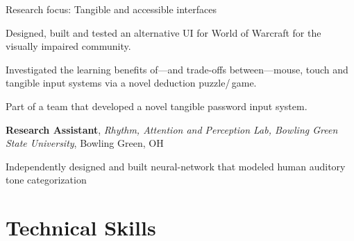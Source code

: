 \documentclass[10pt, letter]{article}
\newcommand{\years}[1]{\marginnote{\footnotesize #1}}
\newenvironment{desc*}{
  \begin{description}
    \setlength{\itemsep}{0.2pt}
    \setlength{\parskip}{-1pt}
    \setlength{\parsep}{0pt}
  }{
  \end{description}
}
\begin{document}
Research focus: Tangible and accessible interfaces %
\begin{itemize}[leftmargin=*, parsep=1pt, rightmargin=1.5cm]
  {\light
\item Designed, built and tested an alternative UI for World of Warcraft for
  the visually impaired community. 
\item Investigated the learning benefits of---and trade-offs between---mouse,
  touch and tangible input systems via a novel deduction puzzle/\,game.
\item Part of a team that developed a novel tangible password input system.
  }
\end{itemize}
\bigskip
\years{2008 - 2010} 
\textbf{Research Assistant},
\textit{Rhythm, Attention and Perception Lab, Bowling Green State
  University}, Bowling Green, OH\\ 
\vspace{-.3cm}
\begin{itemize}[leftmargin=*, parsep=1pt, rightmargin=1.5cm]
  {\light
\item Independently designed and built neural-network that
  modeled human auditory tone categorization
  }
\end{itemize}

\newpage
\section*{Technical Skills}
\end{document}
